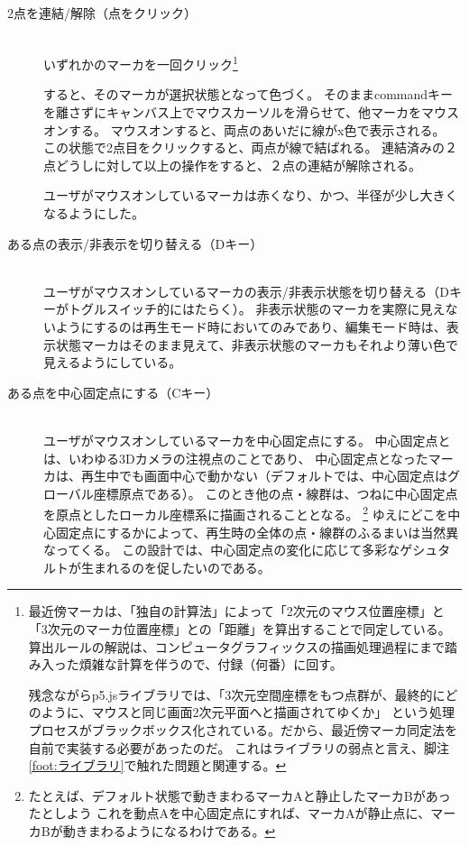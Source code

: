 \begin{description}    
  \item [2点を連結/解除（点をクリック）]\mbox{}\\
  いずれかのマーカを一回クリック\footnote{  
    最近傍マーカは、「独自の計算法」によって「2次元のマウス位置座標」と「3次元のマーカ位置座標」との「距離」を算出することで同定している。  
    算出ルールの解説は、コンピュータグラフィックスの描画処理過程にまで踏み入った煩雑な計算を伴うので、付録（何番）に回す。
  
    残念ながらp5.jsライブラリでは、「3次元空間座標をもつ点群が、最終的にどのように、マウスと同じ画面2次元平面へと描画されてゆくか」
    という処理プロセスがブラックボックス化されている。だから、最近傍マーカ同定法を自前で実装する必要があったのだ。
    これはライブラリの弱点と言え、脚注\ref{foot:ライブラリ}で触れた問題と関連する。}

    すると、そのマーカが選択状態となって色づく。
    そのままcommandキーを離さずにキャンバス上でマウスカーソルを滑らせて、他マーカをマウスオンする。
    マウスオンすると、両点のあいだに線がx色で表示される。
    この状態で2点目をクリックすると、両点が線で結ばれる。
    連結済みの２点どうしに対して以上の操作をすると、２点の連結が解除される。

    ユーザがマウスオンしているマーカは赤くなり、かつ、半径が少し大きくなるようにした。
  
    \item [ある点の表示/非表示を切り替える（Dキー）]\mbox{}\\
    ユーザがマウスオンしているマーカの表示/非表示状態を切り替える（Dキーがトグルスイッチ的にはたらく）。
    非表示状態のマーカを実際に見えないようにするのは再生モード時においてのみであり、編集モード時は、表示状態マーカはそのまま見えて、非表示状態のマーカもそれより薄い色で見えるようにしている。

    \item [ある点を中心固定点にする（Cキー）]\mbox{}\\
    ユーザがマウスオンしているマーカを中心固定点にする。
    中心固定点とは、いわゆる3Dカメラの注視点のことであり、
    中心固定点となったマーカは、再生中でも画面中心で動かない（デフォルトでは、中心固定点はグローバル座標原点である）。
    このとき他の点・線群は、つねに中心固定点を原点としたローカル座標系に描画されることとなる。
    \footnote{
      たとえば、デフォルト状態で動きまわるマーカAと静止したマーカBがあったとしよう
      これを動点Aを中心固定点にすれば、マーカAが静止点に、マーカBが動きまわるようになるわけである。
      }    
    ゆえにどこを中心固定点にするかによって、再生時の全体の点・線群のふるまいは当然異なってくる。
    この設計では、中心固定点の変化に応じて多彩なゲシュタルトが生まれるのを促したいのである。


\end{description}
